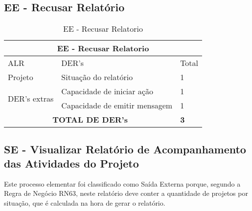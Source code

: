  \subsection{EE - Recusar Relatório }
    \begin{table}[!h]
\centering
\caption{EE - Recusar Relatorio}
\label{ee_recusar_relatorio_parcial}
\begin{tabular}{|l|l|l|}
\multicolumn{3}{c}{EE - Recusar Relatorio}           \\ \hline
ALR                      & DER's                      & Total         \\ \hline
Projeto                  & Situação do relatório      & 1             \\\hline
  \multirow{2}{*}{DER's extras} & Capacidade de iniciar ação             & 1 \\ \cline{2-3}
                 & Capacidade de emitir mensagem& 1 \\ \hline
\multicolumn{2}{|c|}{\textbf{TOTAL DE DER's}}                & \textbf{3} \\ \hline
\end{tabular}
\end{table}
  \pagebreak  

  \subsection{SE - Visualizar Relatório de Acompanhamento das Atividades do Projeto}
  
    Este processo elementar foi classificado como Saída Externa porque, segundo a Regra de Negócio RN63, neste relatório
    deve conter a quantidade de projetos por situação, que é calculada na hora de gerar o relatório.
    
